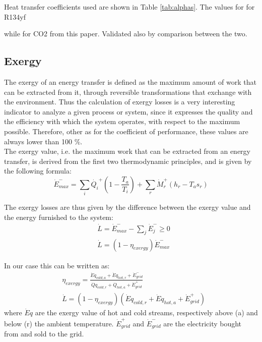 \documentclass{article}
\begin{document}
Heat transfer coefficients used are shown in Table \ref{tab:alphas}.
The values for for R134yf \cite{wangOverviewHeatTransfer2013}

while for CO2 from this paper\cite{ohFlowBoilingHeat2011}.
Validated also by comparison between the two\cite{mastrulloComparisonR744R134a2009}. 
\\




\subsection{Exergy}\label{ss:exergy}
The exergy of an energy transfer is defined as the maximum amount of work that can be extracted from it, through reversible transformations that exchange with the environment. Thus the calculation of exergy losses is a very interesting indicator to analyze a given process or system, since it expresses the quality and the efficiency with which the system operates, with respect to the maximum possible. Therefore, other as for the coefficient of performance, these values are always lower than 100 \%. \\

The exergy value, i.e. the maximum work that can be extracted from an energy transfer, is derived from the first two thermodynamic principles, and is given by the following formula:
\begin{equation}
    \dot{E}^{-}_{max} = \sum_{i} \dot{Q_i}^{+} (1 - \frac{T_{a}}{T_i} ) + \sum_{r} \dot{M}_{r}^{+} (h_{r} - T_{a} s_{r})    
\end{equation}

The exergy losses are thus given by the difference between the exergy value and the energy furnished to the system:
\begin{align}
	&    \dot{L} = \dot{E}^{-}_{max} - \sum_{j}\dot{E}^{-}_{j} \geq 0 \\
	& 	\dot{L} = (1-\eta_{exergy})\dot{E}^{-}_{max}
\end{align}

In our case this can be written as:
\begin{align}
    & \eta_{exergy} =  \frac{\dot{E}q_{cold,a} + \dot{E}q_{hot,r} + \dot{E}_{grid}^{-}}{\dot{Q}q_{cold,r} + \dot{Q}_{hot,a} + \dot{E}_{grid}^{+}}  \\
    & \dot{L} = (1-\eta_{exergy})(\dot{E}q_{cold,r} + \dot{E}q_{hot,a} + \dot{E}_{grid}^{+})
\end{align}
where $\dot{E}q$ are the exergy value of hot and cold streams, respectively above (a) and below (r) the ambient temperature. $\dot{E}_{grid}^{+}$ and $\dot{E}_{grid}^{-}$ are the electricity bought from and sold to the grid.
\end{document}
